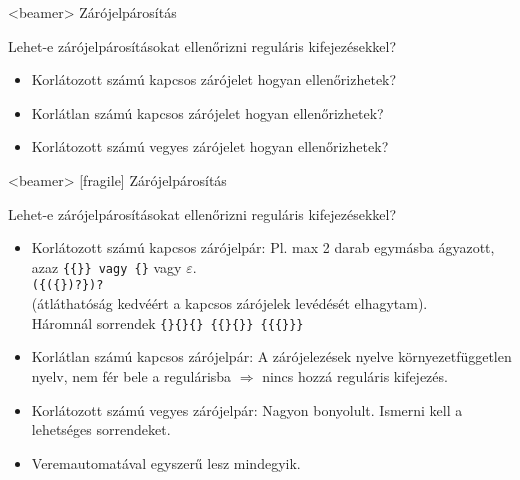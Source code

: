 \documentclass[
    ignorenonframetext
    ]{beamer}
\begin{document}
\begin{frame}<beamer>
    {Zárójelpárosítás}

    Lehet-e zárójelpárosításokat ellenőrizni reguláris kifejezésekkel?

    \begin{itemize}[<+->]
        \item Korlátozott számú kapcsos zárójelet hogyan ellenőrizhetek?
        \item Korlátlan számú kapcsos zárójelet hogyan ellenőrizhetek?
        \item Korlátozott számú vegyes zárójelet hogyan ellenőrizhetek?
    \end{itemize}
\end{frame}

\begin{frame}<beamer>
    [fragile]
    {Zárójelpárosítás}

    Lehet-e zárójelpárosításokat ellenőrizni reguláris kifejezésekkel?

    \begin{itemize}[<+->]
        \item Korlátozott számú kapcsos zárójelpár:
            Pl. max 2 darab egymásba ágyazott, azaz \verb"{{}} vagy {}"
            vagy $\varepsilon$.\\
            \verb!({({})?})?!   \\
            (átláthatóság kedvéért a kapcsos zárójelek levédését
            elhagytam).\\
            Háromnál sorrendek \verb"{}{}{} {{}{}} {{{}}}"
        \item Korlátlan számú kapcsos zárójelpár:
            A zárójelezések nyelve környezetfüggetlen nyelv, nem fér
            bele a regulárisba $\Rightarrow$ nincs hozzá reguláris
            kifejezés. 
        \item Korlátozott számú vegyes zárójelpár:
            Nagyon bonyolult. Ismerni kell a lehetséges sorrendeket.
        \item Veremautomatával egyszerű lesz mindegyik. 
    \end{itemize}
\end{frame}
\end{document}
